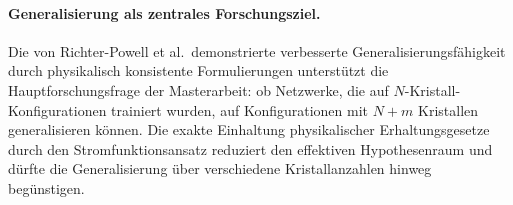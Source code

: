 \documentclass[a4paper,12pt]{article}
\begin{document}
\paragraph{Generalisierung als zentrales Forschungsziel.}
Die von Richter-Powell et al.\ demonstrierte verbesserte Generalisierungsf\"ahigkeit durch
physikalisch konsistente Formulierungen unterst\"utzt die Hauptforschungsfrage der Masterarbeit:
ob Netzwerke, die auf $N$-Kristall-Konfigurationen trainiert wurden, auf Konfigurationen mit
$N+m$ Kristallen generalisieren k\"onnen. Die exakte Einhaltung physikalischer Erhaltungsgesetze
durch den Stromfunktionsansatz reduziert den effektiven Hypothesenraum und d\"urfte die
Generalisierung \"uber verschiedene Kristallanzahlen hinweg beg\"unstigen.
\end{document}
